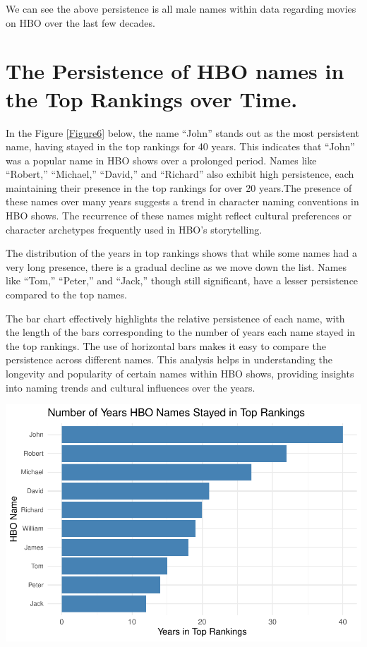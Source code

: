 \documentclass[11pt,preprint, authoryear]{elsarticle}
\let\origfigure\figure
\let\endorigfigure\endfigure
\renewenvironment{figure}[1][2] {
    \expandafter\origfigure\expandafter[H]
} {
    \endorigfigure
}
\numberwithin{equation}{section}
\numberwithin{figure}{section}
\numberwithin{table}{section}
\begin{document}
We can see the above persistence is all male names within data regarding
movies on HBO over the last few decades.

\hypertarget{the-persistence-of-hbo-names-in-the-top-rankings-over-time.}{%
\section{The Persistence of HBO names in the Top Rankings over
Time.}\label{the-persistence-of-hbo-names-in-the-top-rankings-over-time.}}

In the Figure \ref{Figure6} below, the name ``John'' stands out as the
most persistent name, having stayed in the top rankings for 40 years.
This indicates that ``John'' was a popular name in HBO shows over a
prolonged period. Names like ``Robert,'' ``Michael,'' ``David,'' and
``Richard'' also exhibit high persistence, each maintaining their
presence in the top rankings for over 20 years.The presence of these
names over many years suggests a trend in character naming conventions
in HBO shows. The recurrence of these names might reflect cultural
preferences or character archetypes frequently used in HBO's
storytelling.

The distribution of the years in top rankings shows that while some
names had a very long presence, there is a gradual decline as we move
down the list. Names like ``Tom,'' ``Peter,'' and ``Jack,'' though still
significant, have a lesser persistence compared to the top names.

The bar chart effectively highlights the relative persistence of each
name, with the length of the bars corresponding to the number of years
each name stayed in the top rankings. The use of horizontal bars makes
it easy to compare the persistence across different names. This analysis
helps in understanding the longevity and popularity of certain names
within HBO shows, providing insights into naming trends and cultural
influences over the years.

\begin{figure}

{\centering \includegraphics{README_files/figure-latex/unnamed-chunk-6-1} 

}

\caption{The Persistence of HBO names in the top rankings over time.\label{Figure6}}\label{fig:unnamed-chunk-6}
\end{figure}
\end{document}
